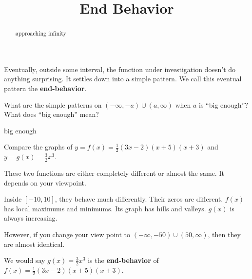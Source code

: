 \documentclass{ximera}
\title{End Behavior}
\begin{document}
\begin{abstract}
approaching infinity
\end{abstract}
\maketitle







Eventually, outside some interval, the function under investigation doesn't do anything surprising.  It settles down into a simple pattern.  We call this eventual pattern the \textbf{\textcolor{purple!85!blue}{end-behavior}}.



What are the simple patterns on $(-\infty, -a) \cup (a, \infty)$ when $a$ is ``big enough''?  What does ``big enough'' mean?




\begin{example} big enough





Compare the graphs of $y = f(x) = \frac{1}{2}(3x-2)(x+5)(x+3)$ and $y=g(x) = \frac{3}{2}x^3$.



\begin{center}
\end{center}







\begin{center}
\end{center}







These two functions are either completely different or almost the same.  It depends on your viewpoint.

Inside $[-10, 10]$, they behave much differently. Their zeros are different.  $f(x)$ has local maximums and minimums.  Its graph has hills and valleys.  $g(x)$ is always increasing.

However, if you change your view point to $(-\infty, -50) \cup (50, \infty)$, then they are almost identical.


We would say $g(x) = \frac{3}{2}x^3$ is the \textbf{end-behavior} of $f(x) = \frac{1}{2}(3x-2)(x+5)(x+3)$.






\end{example}
\end{document}
